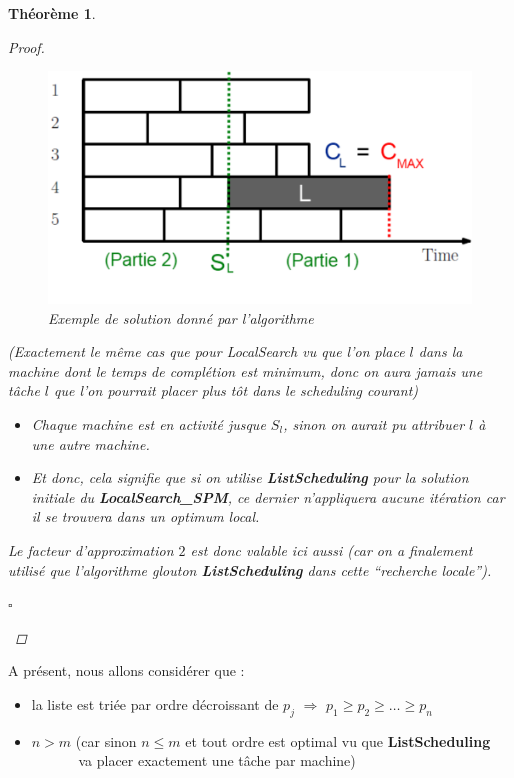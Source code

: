 \documentclass{article}
\newcommand{\cqfd}{\begin{flushright}$\square$\end{flushright}}
\newtheorem{thm}{Th\'eor\`eme}[section]
\newtheorem{proof}{Preuve}[section]
\begin{document}
\begin{sffamily}
\begin{thm}
\begin{proof}
\begin{figure}[h!]
    \begin{center}
    \includegraphics[scale=0.45]{spm4.pdf}
    \caption{Exemple de solution donné par l'algorithme}
    \end{center}	
\end{figure}

\noindent (Exactement le même cas que pour LocalSearch vu que l'on place $l$ dans la
machine dont le temps de complétion est minimum, donc on aura jamais une tâche
$l$ que l'on pourrait placer plus tôt dans le scheduling courant)

\noindent \begin{itemize}
\item[$\Rightarrow$] Chaque machine est en activité jusque $S_l$, sinon on aurait pu
attribuer $l$ à une autre machine.
\item[$\Rightarrow$] Et donc, cela signifie que si on utilise \textbf{ListScheduling} pour la
solution initiale du \textbf{LocalSearch\_SPM}, ce dernier n'appliquera aucune itération car il se trouvera dans un optimum local. \\
\end{itemize}

\noindent Le facteur d'approximation $2$ est donc valable ici aussi (car on a finalement utilisé que l'algorithme glouton 
\textbf{ListScheduling} dans cette ``recherche locale'').
\cqfd
\end{proof}
\end{thm}

\noindent A présent, nous allons considérer que :
\begin{itemize}
\item la liste est triée par ordre décroissant de $p_j$ $\Longrightarrow$ $p_1\geq p_2 \geq \ldots \geq p_n$
\item $n > m$ (car sinon $n\leq m$ et tout ordre est optimal vu que \textbf{ListScheduling} \\\indent $\qquad\quad$ va placer exactement 
une tâche par machine) \\
\end{itemize}
  

\end{sffamily}
\end{document}
